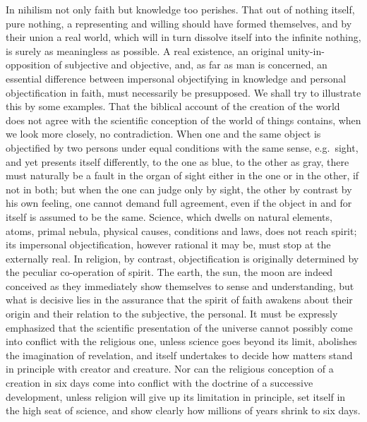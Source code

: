 \documentclass[12pt,a4paper]{article}
\newcommand{\opage}[1]{\marginnote{\footnotesize\textit{[#1]}}}
\begin{document}
In nihilism not only faith but knowledge too perishes. That out of
nothing itself, pure nothing, a representing and willing should have
formed themselves, and by their union a real world, which will in turn
dissolve itself into the infinite nothing, is surely as meaningless as
possible. A real existence, an original unity-in-opposition of subjective
and objective, and, as far as man is concerned, an essential difference
between impersonal objectifying in knowledge and personal objectification
in faith, must necessarily be presupposed. We shall try to illustrate
this by some examples. That the biblical account of the creation of the
world does not agree with the scientific conception of the world of
things contains, when we look more closely, no contradiction. When one
and the same object is objectified by two persons under equal conditions
with the same sense, e.g.\ sight, and yet presents itself differently,
to the one as blue, to the other as gray, there must naturally be a fault
in the organ of sight either in the one or in the other, if not in both;
but when the one can judge only by sight, the other by contrast by his
own feeling, one cannot demand full agreement, even if the object in and
for itself is assumed to be the same. Science, which dwells on natural
elements, atoms, primal nebula, physical causes, conditions and laws,
does not reach spirit; its impersonal objectification, however rational
it may be, must stop at the externally real. In religion, by contrast,
objectification is originally determined by the peculiar co-operation of
spirit. The earth, the sun, the moon are indeed conceived as they
immediately show themselves to sense and understanding, but what is
decisive lies in the assurance that the spirit of faith awakens about
their origin and their relation to
\opage{50}the subjective, the personal. It must be expressly emphasized that the
scientific presentation of the universe cannot possibly come into
conflict with the religious one, unless science goes beyond its limit,
abolishes the imagination of revelation, and itself undertakes to decide
how matters stand in principle with creator and creature. Nor can the
religious conception of a creation in six days come into conflict with
the doctrine of a successive development, unless religion will give up
its limitation in principle, set itself in the high seat of science, and
show clearly how millions of years shrink to six days.
\end{document}

